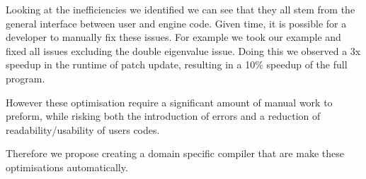 Looking at the inefficiencies we identified we can see that they all stem from the general interface between user and engine code.
Given time, it is possible for a developer to manually fix these issues.
For example we took our example and fixed all issues excluding the double eigenvalue issue.
Doing this we observed a 3x speedup in the runtime of patch update, resulting in a 10\% speedup of the full program.

However these optimisation require a significant amount of manual work to preform, while risking both the introduction of errors and a reduction of readability/usability of users codes.

Therefore we propose creating a domain specific compiler that are make these optimisations automatically.


